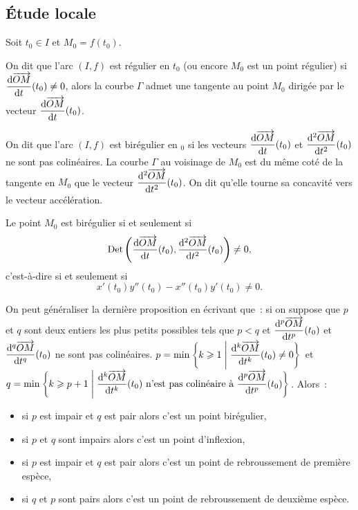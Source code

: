 \subsection{Étude locale}
Soit \(t_0 \in I\) et \(M_0=f(t_0)\).
\begin{defdef}
 On dit que l'arc \((I,f)\) est régulier en \(t_0\) (ou encore \(M_0\) est un point régulier) si \(\dfrac{\mathrm{d} \overrightarrow{OM}}{\mathrm{d} t}(t_0) \neq 0\), alors la courbe \(\Gamma\) admet une tangente au point \(M_0\) dirigée par le vecteur \(\dfrac{\mathrm{d} \overrightarrow{OM}}{\mathrm{d} t}(t_0)\).%
\end{defdef}
\begin{defdef}
 On dit que l'arc \((I,f)\) est birégulier en \(_0\) si les vecteurs \(\dfrac{\mathrm{d} \overrightarrow{OM}}{\mathrm{d} t}(t_0)\) et \(\dfrac{\mathrm{d}^2 \overrightarrow{OM}}{\mathrm{d} {t}^2}(t_0)\) ne sont pas colinéaires. La courbe \(\Gamma\) au voisinage de \(M_0\) est du même coté de la tangente en \(M_0\) que le vecteur \(\dfrac{\mathrm{d}^2 \overrightarrow{OM}}{\mathrm{d} {t}^2}(t_0)\). On dit qu'elle \og tourne sa concavité\fg{} vers le vecteur accélération.
\end{defdef}
\begin{prop}
 Le point \(M_0\) est birégulier si et seulement si
 \begin{equation}
  \operatorname{Det}\left(\dfrac{\mathrm{d} \overrightarrow{OM}}{\mathrm{d} t}(t_0),\dfrac{\mathrm{d}^2 \overrightarrow{OM}}{\mathrm{d} {t}^2}(t_0)\right) \neq 0,
 \end{equation}
 c'est-à-dire si et seulement si
 \begin{equation}
  x'(t_0)y''(t_0) - x''(t_0)y'(t_0) \neq 0.
 \end{equation}
\end{prop}
On peut généraliser la dernière proposition en écrivant que~: si on suppose que \(p\) et \(q\) sont deux entiers les plus petits possibles tels que \(p<q\) et \(\dfrac{\mathrm{d}^p \overrightarrow{OM}}{\mathrm{d} t^p}(t_0)\) et \(\dfrac{\mathrm{d}^q \overrightarrow{OM}}{\mathrm{d} t^q}(t_0)\) ne sont pas colinéaires. \(p=\min\left\{k\geqslant 1\mathrel{}\middle|\mathrel{}\dfrac{\mathrm{d}^k \overrightarrow{OM}}{\mathrm{d} t^k}(t_0) \neq 0\right\}\) et \(q=\min\left\{k\geqslant p+1\mathrel{}\middle|\mathrel{}\dfrac{\mathrm{d}^k \overrightarrow{OM}}{\mathrm{d} t^k}(t_0) \text{~n'est pas colinéaire à~} \dfrac{\mathrm{d}^p \overrightarrow{OM}}{\mathrm{d} t^p}(t_0)\right\}\). Alors~:
\begin{itemize}
\item si \(p\) est impair et \(q\) est pair alors c'est un point birégulier,
\item si \(p\) et \(q\) sont impairs alors c'est un point d'inflexion,
\item si \(p\) est impair et \(q\) est pair alors c'est un point de rebroussement de première espèce,
\item si \(q\) et \(p\) sont pairs alors c'est un point de rebroussement de deuxième espèce.
\end{itemize}
